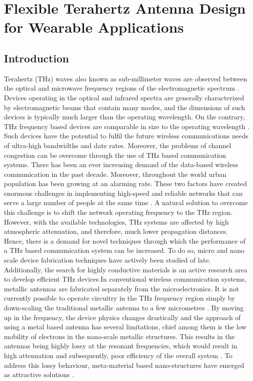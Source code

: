 \documentclass[12pt]{suhbook}
\begin{document}
% 
% 
% 
\setcounter{chapter}{3}%
% 
% 
% 
\chapter{Flexible Terahertz Antenna Design for Wearable Applications}
% 
% 
% 
\section{Introduction}
% 
% 
Terahertz (THz) waves also known as sub-millimeter waves are observed between the optical and microwave frequency regions of the electromagnetic spectrum \cite{liu2009advanced,grischkowsky1990far}. Devices operating in the optical and infrared spectra are generally characterized by electromagnetic beams that contain many modes, and the dimensions of such devices is typically much larger than the operating wavelength. On the contrary, THz frequency based devices are comparable in size to the operating wavelength \cite{shi2018thz}. Such devices have the potential to fulfil the future wireless communications needs of ultra-high bandwidths and date rates. Moreover, the problems of channel congestion can be overcome through the use of THz based communication systems. 
There has been an ever increasing demand of the data-based wireless communication in the past decade. Moreover, throughout the world urban population has been growing at an alarming rate. These two factors have created enormous challenges in implementing high-speed and reliable networks that can serve a large number of people at the same time \cite{song2011present}. A natural solution to overcome this challenge is to shift the network operating frequency to the THz region. However, with the available technologies, THz systems are affected by high atmospheric attenuation, and therefore, much lower propagation distances. Hence, there is a demand for novel techniques through which the performance of a THz based communication system can be increased. To do so, micro and nano scale device fabrication techniques have actively been studied of late. Additionally, the search for highly conductive materials is an active research area to develop efficient THz devices.In conventional wireless communication systems, metallic antennas are fabricated separately from the microelectronics. It is not currently possible to operate circuitry in the THz frequency region simply by down-scaling the traditional metallic antenna to a few micrometres \cite{kleine2011review}. By moving up in the frequency, the device physics changes drastically and the approach of using a metal based antenna has several limitations, chief among them is the low mobility of electrons in the nano-scale metallic structures. This results in the antennas being highly lossy at the resonant frequencies, which would result in high attenuation and subsequently, poor efficiency of the overall system \cite{pourahmadazar2018millimeter}. To address this lossy behaviour, meta-material based nano-structures have emerged as attractive solutions \cite{chen2006active}.
\end{document}

